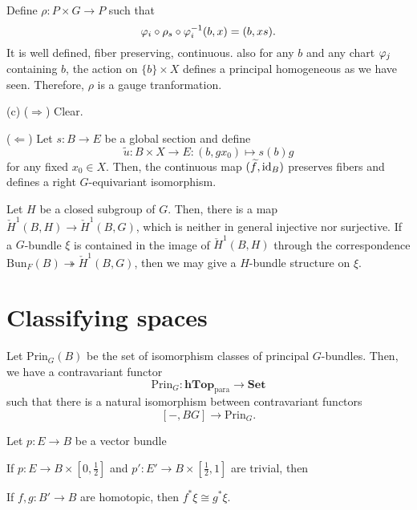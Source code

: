 \documentclass{../../large}
\begin{document}
\begin{pf}
Define $\rho:P\times G\to P$ such that
\[\varphi_i\circ\rho_s\circ\varphi_i^{-1}(b,x)=(b,xs).\]
It is well defined, fiber preserving, continuous.
also for any $b$ and any chart $\varphi_j$ containing $b$, the action on $\{b\}\times X$ defines a principal homogeneous as we have seen.
Therefore, $\rho$ is a gauge tranformation.

(c)
($\Rightarrow$)
Clear.

($\Leftarrow$)
Let $s:B\to E$ be a global section and define
\[\tilde u:B\times X\to E:(b,gx_0)\mapsto s(b)g\]
for any fixed $x_0\in X$.
Then, the continuous map $(\widetilde f,\operatorname{id}_B)$ preserves fibers and defines a right $G$-equivariant isomorphism.
\end{pf}

\begin{prb}

\end{prb}

\begin{prb}
Let $H$ be a closed subgroup of $G$.
Then, there is a map $\check H^1(B,H)\to\check H^1(B,G)$, which is neither in general injective nor surjective.
If a $G$-bundle $\xi$ is contained in the image of $\check H^1(B,H)$ through the correspondence $\mathrm{Bun}_F(B)\twoheadrightarrow\check H^1(B,G)$, then we may give a $H$-bundle structure on $\xi$.
\end{prb}

\section{Classifying spaces}

Let $\mathrm{Prin}_G(B)$ be the set of isomorphism classes of principal $G$-bundles.
Then, we have a contravariant functor
\[\mathrm{Prin}_G:\mathbf{hTop}_{\mathrm{para}}\to\mathbf{Set}\]
such that there is a natural isomorphism between contravariant functors
\[[-,BG]\to\mathrm{Prin}_G.\]


\begin{prb}
Let $p:E\to B$ be a vector bundle
\begin{parts}
\item If $p:E\to B\times[0,\frac12]$ and $p':E'\to B\times[\frac12,1]$ are trivial, then 
\item If $f,g:B'\to B$ are homotopic, then $f^*\xi\cong g^*\xi$.
\end{parts}
\end{prb}

\begin{prb}

\end{prb}
\end{document}
